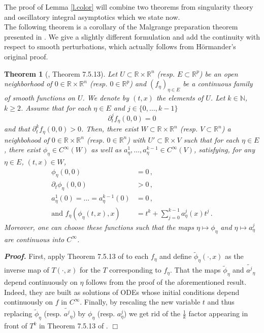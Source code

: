 \documentclass[10pt,twoside]{article}
\newcommand{\R}{\mathbb{R}}
\newcommand{\N}{\mathbb{N}}
\newenvironment{prf}[1][]
{\vskip 2mm  {\it \bf Proof#1. }}{$\Box$ \vskip 2mm}
\newtheorem{theorem}{Theorem}
\numberwithin{theorem}{section}
\begin{document}
The proof of Lemma \ref{l.color} will combine two theorems from singularity theory and oscillatory integral asymptotics which we state now.\\


The following theorem is a corollary of the Malgrange preparation theorem presented in \cite{ho_apdo1}. We give a slightly different formulation and add the continuity with respect to smooth perturbations, which actually follows from H\"ormander's original proof.
\begin{theorem}[\cite{ho_apdo1}, Theorem 7.5.13]\label{t.color.1}
Let $U\subset\R\times\R^n$ (resp. $E\subset\R^p$) be an open neighborhood of $0\in\R\times\R^n$ (resp. $0\in\R^p$) and $(f_\eta)_{\eta\in E}$ be a continuous family of smooth functions on $U$. We denote by $(t,x)$ the elements of $U$. Let $k\in\N$, $k\geq 2$. Assume that for each $\eta\in E$ and $j\in\{0,\dots,k-1\}$
\[
\partial^j_tf_\eta(0,0)=0
\]
and that $\partial^k_tf_\eta(0,0)>0$. Then, there exist $W\subset\R\times\R^n$ (resp. $V\subset\R^n$) a neighbohood of $0\in\R\times\R^n$ (resp. $0\in\R^n$) with $U'\subset \R\times V$ such that for each $\eta\in E$, there exist $\phi_\eta\in C^\infty(W)$ as well as $a^1_\eta,\dots,a^{k-1}_\eta\in C^\infty(V)$, satisfying, for any $\eta\in E$, $(t,x)\in W$,
\begin{align*}
\phi_\eta(0,0)&=0\, ,\\
\partial_t\phi_\eta(0,0)&>0\, ,\\
a^1_\eta(0)=\dots=a^{k-1}_\eta(0)&=0\, ,\\
\text{and }f_\eta(\phi_\eta(t,x),x)&=t^k+\sum_{j=0}^{k-1}a_\eta^j(x)t^j\, .
\end{align*}
Moreover, one can choose these functions such that the maps $\eta\mapsto \phi_\eta$ and $\eta\mapsto a_\eta^j$ are continuous into $C^\infty$.
\end{theorem}
\begin{prf}
First, apply Theorem 7.5.13 of \cite{ho_apdo1} to each $f_\eta$ and define $\tilde{\phi}_\eta(\cdot,x)$ as the inverse map of $T(\cdot,x)$ for the $T$ corresponding to $f_\eta$. That the maps $\tilde{\phi}_\eta$ and $\tilde{a^j}_\eta$ depend continuously on $\eta$ follows from the proof of the aforementioned result. Indeed, they are built as solutions of ODEs whose initial conditions depend continuously on $f$ in $C^\infty$. Finally, by rescaling the new variable $t$ and thus replacing $\tilde{\phi}_\eta$ (resp. $\tilde{a^j}_\eta$) by $\phi_\eta$ (resp. $a^j_\eta$) we get rid of the $\frac{1}{k}$ factor appearing in front of $T^k$ in Theorem 7.5.13 of \cite{ho_apdo1}.
\end{prf}
\end{document}
